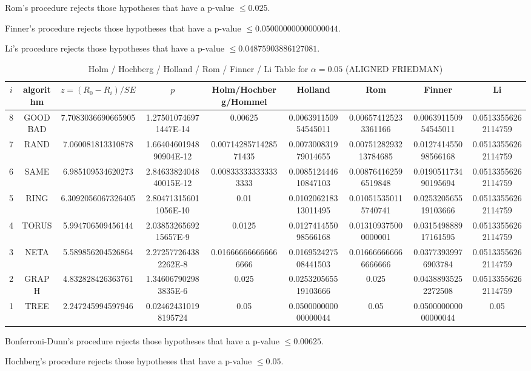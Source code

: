 \documentclass[a4paper,10pt]{article}
\begin{document}
\begin{landscape}
Rom's procedure rejects those hypotheses that have a p-value $\le0.025$.


Finner's procedure rejects those hypotheses that have a p-value $\le0.050000000000000044$.


Li's procedure rejects those hypotheses that have a p-value $\le0.04875903886127081$.



\newpage

\begin{table}[!htp]
\centering\scriptsize
\caption{Holm / Hochberg / Holland / Rom / Finner / Li Table for $\alpha=0.05$ (ALIGNED FRIEDMAN)}
\begin{tabular}{ccccccccc}
$i$&algorithm&$z=(R_0 - R_i)/SE$&$p$&Holm/Hochberg/Hommel&Holland&Rom&Finner&Li\\
\hline
8& GOODBAD&7.7083036690665905&1.275010746971447E-14&0.00625&0.006391150954545011&0.006574125233361166&0.006391150954545011&0.05133556262114759\\
7& RAND&7.060081813310878&1.6640460194890904E-12&0.0071428571428571435&0.007300831979014655&0.0075128293213784685&0.012741455098566168&0.05133556262114759\\
6& SAME&6.985109534620273&2.8463382404840015E-12&0.008333333333333333&0.008512444610847103&0.008764162596519848&0.019051173490195694&0.05133556262114759\\
5& RING&6.3092056067326405&2.804713156011056E-10&0.01&0.010206218313011495&0.010515350115740741&0.025320565519103666&0.05133556262114759\\
4& TORUS&5.994706509456144&2.0385326569215657E-9&0.0125&0.012741455098566168&0.013109375000000001&0.031549888917161595&0.05133556262114759\\
3& NETA&5.589856204526864&2.272577264382262E-8&0.016666666666666666&0.016952427508441503&0.016666666666666666&0.03773939976903784&0.05133556262114759\\
2& GRAPH&4.832828426363761&1.346067902983835E-6&0.025&0.025320565519103666&0.025&0.04388935252272508&0.05133556262114759\\
1& TREE&2.247245994597946&0.024624310198195724&0.05&0.050000000000000044&0.05&0.050000000000000044&0.05\\
\hline
\end{tabular}
\end{table}
Bonferroni-Dunn's procedure rejects those hypotheses that have a p-value $\le0.00625$.


Hochberg's procedure rejects those hypotheses that have a p-value $\le0.05$.



\end{landscape}
\end{document}
